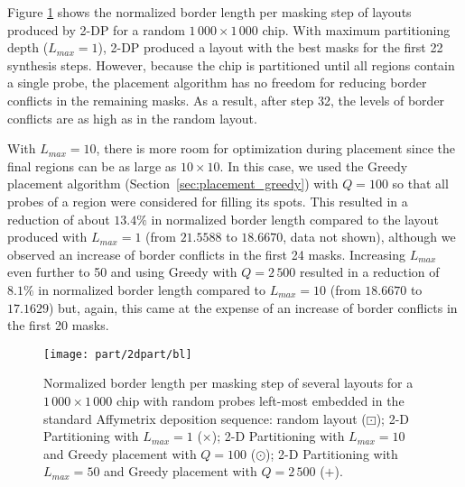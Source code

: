 Figure \ref{fig:2dpart_bl} shows the normalized border length per masking step
of layouts produced by 2-DP for a random $1\,000\times 1\,000$ chip. With maximum
partitioning depth ($L_{max}=1$), 2-DP produced a layout with the best masks for
the first 22 synthesis steps. However, because the chip is partitioned until all
regions contain a single probe, the placement algorithm has no freedom for
reducing border conflicts in the remaining masks. As a result, after step 32,
the levels of border conflicts are as high as in the random layout.

With $L_{max}=10$, there is more room for optimization during placement since
the final regions can be as large as $10\times 10$. In this case, we used the
Greedy placement algorithm (Section~\ref{sec:placement_greedy}) with $Q=100$ so
that all probes of a region were considered for filling its spots. This resulted
in a reduction of about $13.4\%$ in normalized border length compared to the
layout produced with $L_{max}=1$ (from $21.5588$ to $18.6670$, data not shown),
although we observed an increase of border conflicts in the first 24 masks.
Increasing $L_{max}$ even further to 50 and using Greedy with $Q=2\,500$
resulted in a reduction of $8.1\%$ in normalized border length compared to
$L_{max}=10$ (from $18.6670$ to $17.1629$) but, again, this came at the expense
of an increase of border conflicts in the first 20 masks.

\begin{figure}[t]\centering
\texttt{[image: part/2dpart/bl]}
\caption{\label{fig:2dpart_bl}
  Normalized border length per masking step of several layouts for a
  $1\,000\times 1\,000$ chip with random probes left-most embedded in the
  standard Affymetrix deposition sequence: random layout ({\tiny $\boxdot$}); 2-D
  Partitioning with $L_{max}=1$ ({\scriptsize $\times$}); 2-D Partitioning with
  $L_{max}=10$ and Greedy placement with $Q=100$ ({\tiny $\odot$}); 2-D
  Partitioning with $L_{max}=50$ and Greedy placement with $Q=2\,500$
  ({\tiny $+$}).}
\end{figure}

